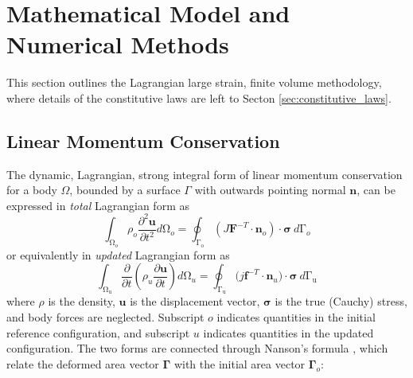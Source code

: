 \documentclass[sn-mathphys,Numbered]{sn-jnl}%
\newcommand{\bb}{\boldsymbol}
\begin{document}
\section{Mathematical Model and Numerical Methods}\label{sec:math_model}

This section outlines the Lagrangian large strain, finite volume methodology, where details of the constitutive laws are left to Secton \ref{sec:constitutive_laws}.

\subsection{Linear Momentum Conservation}

The dynamic, Lagrangian, strong integral form of linear momentum conservation for a body $\Omega$, bounded by a surface $\Gamma$ with outwards pointing normal $\textbf{n}$, can be expressed in \emph{total} Lagrangian form as
\begin{equation} \label{eqn:totalLagFormulation}
    \int_{\mathrm{\Omega}_o} \rho_o \frac{\partial^2 \bb{u} }{\partial t^2} d\mathrm{\Omega}_o
    =
    \oint_{\mathrm{\Gamma_o}} \left( J \bb{F}^{-T} \cdot \bb{n}_o \right) \cdot \boldsymbol{\sigma} \ d\mathrm{\Gamma}_o
\end{equation}
or equivalently in \emph{updated} Lagrangian form as
\begin{equation} \label{eqn:updatedLagFormulation}
    \int_{\mathrm{\Omega_u}} \frac{\partial }{\partial t} \left( \rho_u \frac{\partial \bb{u} }{\partial t} \right) d\mathrm{\Omega}_u
    = \oint_{\mathrm{\Gamma_u}}(j\bb{f}^{-T}\cdot{\bb{n}_u)\cdot\boldsymbol{\sigma}}\ d\mathrm{\Gamma_u}
\end{equation}
where $\rho$ is the density, $\bb{u}$ is the displacement vector, $\boldsymbol{\sigma}$ is the true (Cauchy) stress, and body forces are neglected.
Subscript $o$ indicates quantities in the initial reference configuration, and subscript $u$ indicates quantities in the updated configuration.
The two forms are connected through Nanson’s formula \cite{bathe_finite_1996}, which relate the deformed area vector $\bb{\Gamma}$ with the initial area vector $\bb{\Gamma}_{o}$:
\end{document}
